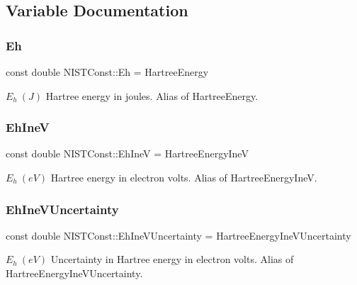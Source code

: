 \subsection{Variable Documentation}
\mbox{\label{group___n_i_s_t_const-_hartree_energy_ga1955ca3dc0e0714b0caa7304e7389140}} 
\subsubsection{\texorpdfstring{Eh}{Eh}}
{\footnotesize\ttfamily const double N\+I\+S\+T\+Const\+::\+Eh = Hartree\+Energy}

$E_h \ (J)$ Hartree energy in joules. Alias of Hartree\+Energy. \mbox{\label{group___n_i_s_t_const-_hartree_energy_ga45991f1895507078b66f94f85e2e8af5}} 
\subsubsection{\texorpdfstring{Eh\+IneV}{EhIneV}}
{\footnotesize\ttfamily const double N\+I\+S\+T\+Const\+::\+Eh\+IneV = Hartree\+Energy\+IneV}

$E_h \ (eV)$ Hartree energy in electron volts. Alias of Hartree\+Energy\+IneV. \mbox{\label{group___n_i_s_t_const-_hartree_energy_ga44de589dbe84c79573b441fa366d320d}} 
\subsubsection{\texorpdfstring{Eh\+Ine\+V\+Uncertainty}{EhIneVUncertainty}}
{\footnotesize\ttfamily const double N\+I\+S\+T\+Const\+::\+Eh\+Ine\+V\+Uncertainty = Hartree\+Energy\+Ine\+V\+Uncertainty}

$E_h \ (eV)$ Uncertainty in Hartree energy in electron volts. Alias of Hartree\+Energy\+Ine\+V\+Uncertainty. \mbox{\label{group___n_i_s_t_const-_hartree_energy_ga52137cfba941de2bd3b1b584bd1f31ee}} 
